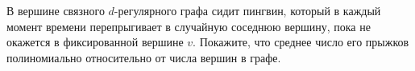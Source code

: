 В вершине связного $d$-регулярного графа сидит пингвин, который в каждый момент	времени перепрыгивает в случайную соседнюю
вершину, пока не окажется в фиксированной вершине $v$. Покажите, что среднее число его прыжков полиномиально относительно от
числа вершин в графе.